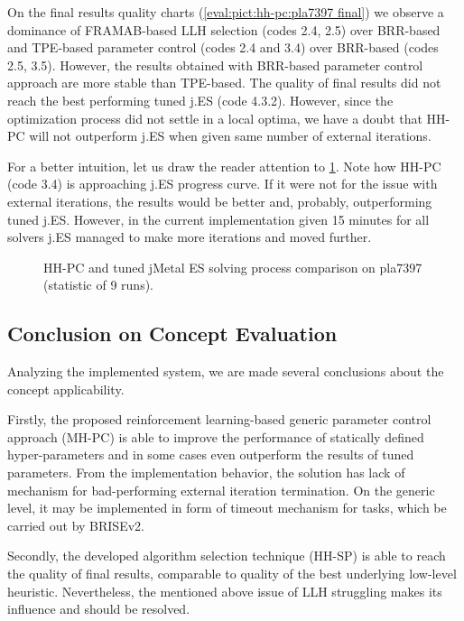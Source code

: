 On the final results quality charts (\cref{eval:pict:hh-pc:pla7397 final}) we observe a dominance of FRAMAB-based LLH selection (codes 2.4, 2.5) over BRR-based and TPE-based parameter control (codes 2.4 and 3.4) over BRR-based (codes 2.5, 3.5). However, the results obtained with BRR-based parameter control approach are more stable than TPE-based. The quality of final results did not reach the best performing tuned j.ES (code 4.3.2). However, since the optimization process did not settle in a local optima, we have a doubt that HH-PC will not outperform j.ES when given same number of external iterations.

For a better intuition, let us draw the reader attention to \cref{eval:pict:hh-pc vs jES on pla7397 process}. Note how HH-PC (code 3.4) is approaching j.ES progress curve. If it were not for the issue with external iterations, the results would be better and, probably, outperforming tuned j.ES. However, in the current implementation given 15 minutes for all solvers j.ES managed to make more iterations and moved further.

\begin{figure}[h]
	\centering
	\vspace{-20pt}
	
	\caption{HH-PC and tuned jMetal ES solving process comparison on pla7397 (statistic of 9 runs).}
	\vspace{-5pt}
	\label{eval:pict:hh-pc vs jES on pla7397 process}
\end{figure}

\subsection{Conclusion on Concept Evaluation}\label{eval:1:conclusion}
Analyzing the implemented system, we are made several conclusions about the concept applicability.

Firstly, the proposed reinforcement learning-based generic parameter control approach (MH-PC) is able to improve the performance of statically defined hyper-parameters and in some cases even outperform the results of tuned parameters. From the implementation behavior, the solution has lack of mechanism for bad-performing external iteration termination. On the generic level, it may be implemented in form of timeout mechanism for tasks, which be carried out by BRISEv2.

Secondly, the developed algorithm selection technique (HH-SP) is able to reach the quality of final results, comparable to quality of the best underlying low-level heuristic. Nevertheless, the mentioned above issue of LLH struggling makes its influence and should be resolved.

